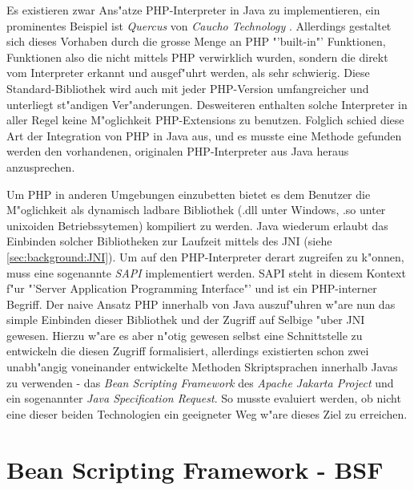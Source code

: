 Es existieren zwar Ans"atze PHP-Interpreter in Java zu implementieren, ein prominentes Beispiel
ist \emph{Quercus} von \emph{Caucho Technology} \cite{CAUCHOHP}. Allerdings gestaltet sich dieses Vorhaben durch
die grosse Menge an PHP "'built-in"' Funktionen, Funktionen also die nicht mittels PHP verwirklich wurden, 
sondern die direkt vom Interpreter erkannt und ausgef"uhrt werden, als sehr schwierig. Diese Standard-Bibliothek wird
auch mit jeder PHP-Version umfangreicher und unterliegt st"andigen Ver"anderungen. Desweiteren enthalten solche
Interpreter in aller Regel keine M"oglichkeit PHP-Extensions zu benutzen. Folglich schied diese Art der
Integration von PHP in Java aus, und es musste eine Methode gefunden werden den vorhandenen, originalen PHP-Interpreter
aus Java heraus anzusprechen.

Um PHP in anderen Umgebungen einzubetten bietet es dem Benutzer die M"oglichkeit als dynamisch ladbare
Bibliothek (.dll unter Windows, .so unter unixoiden Betriebssytemen) kompiliert zu werden. Java wiederum
erlaubt das Einbinden solcher Bibliotheken zur Laufzeit mittels des JNI (siehe \ref{sec:background:JNI}).
Um auf den PHP-Interpreter derart zugreifen zu k"onnen, muss eine sogenannte \emph{SAPI} implementiert
werden. SAPI steht in diesem Kontext f"ur "'Server Application Programming Interface"' und ist ein PHP-interner
Begriff. 
Der naive Ansatz PHP innerhalb von Java auszuf"uhren w"are nun das simple Einbinden dieser Bibliothek und
der Zugriff auf Selbige "uber JNI gewesen. Hierzu w"are es aber n"otig gewesen selbst eine Schnittstelle 
zu entwickeln die diesen Zugriff formalisiert, allerdings existierten schon zwei unabh"angig voneinander entwickelte
Methoden Skriptsprachen innerhalb Javas zu verwenden - das \emph{Bean Scripting Framework} des \emph{Apache
Jakarta Project} und ein sogenannter \emph{Java Specification Request}. So musste evaluiert werden, ob nicht
eine dieser beiden Technologien ein geeigneter Weg w"are dieses Ziel zu erreichen. 

\section{Bean Scripting Framework - BSF}
\label{sec:javanscripts:bsf}

